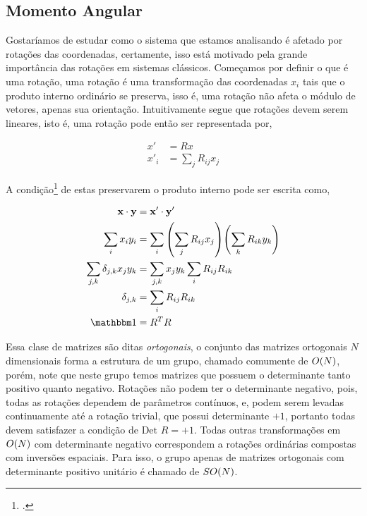 \documentclass[twoside]{amsart}
\numberwithin{equation}{section}
\begin{document}
\begin{refsection}
\section{Momento Angular}

Gostaríamos de estudar como o sistema que estamos analisando é afetado por rotações das coordenadas, certamente, isso está motivado pela grande importância das rotações em sistemas clássicos. Começamos por definir o que é uma rotação, uma rotação é uma transformação das coordenadas $x_i$ tais que o produto interno ordinário se preserva, isso é, uma rotação não afeta o módulo de vetores, apenas sua orientação. Intuitivamente segue que rotações devem serem lineares, isto é, uma rotação pode então ser representada por,

\begin{align}
    x'&=Rx\nonumber\\
    x'_i&=\sum\limits_j R_{ij}x_j
\end{align}

A condição\footcite{sakurai} de estas preservarem o produto interno pode ser escrita como,

\begin{align}
    \vb x\cdot \vb y&=\vb x'\cdot \vb y'\nonumber\\
    \sum\limits_i x_iy_i&=\sum\limits_i\qty(\sum\limits_j R_{ij}x_j)\qty(\sum\limits_k R_{ik}y_k)\nonumber\\
    \sum\limits_{j,k}\delta_{j,k}x_jy_k&=\sum\limits_{j,k}x_jy_k\sum\limits_i R_{ij}R_{ik}\nonumber\\
    \delta_{j,k}&=\sum\limits_i R_{ij}R_{ik}\nonumber\\
    \mathbbm 1 &=R^T R
\end{align}

Essa clase de matrizes são ditas \emph{ortogonais}, o conjunto das matrizes ortogonais $N$ dimensionais forma a estrutura de um grupo, chamado comumente de $O\qty(N)$, porém, note que neste grupo temos matrizes que possuem o determinante tanto positivo quanto negativo. Rotações não podem ter o determinante negativo, pois, todas as rotações dependem de parâmetros contínuos, e, podem serem levadas continuamente até a rotação trivial, que possui determinante $+1$, portanto todas devem satisfazer a condição de $\mbox{Det\ } R = +1$. Todas outras transformações em $O\qty(N)$ com determinante negativo correspondem a rotações ordinárias compostas com inversões espaciais. Para isso, o grupo apenas de matrizes ortogonais com determinante positivo unitário é chamado de $SO\qty(N)$. 


\end{refsection}
\end{document}
